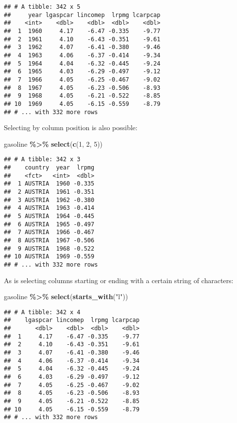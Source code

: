 \documentclass[
]{article}
\newenvironment{Shaded}{\begin{snugshade}}{\end{snugshade}}
\newcommand{\DecValTok}[1]{\textcolor[rgb]{0.00,0.00,0.81}{#1}}
\newcommand{\KeywordTok}[1]{\textcolor[rgb]{0.13,0.29,0.53}{\textbf{#1}}}
\newcommand{\NormalTok}[1]{#1}
\newcommand{\OperatorTok}[1]{\textcolor[rgb]{0.81,0.36,0.00}{\textbf{#1}}}
\newcommand{\StringTok}[1]{\textcolor[rgb]{0.31,0.60,0.02}{#1}}
\begin{document}
\begin{verbatim}
## # A tibble: 342 x 5
##     year lgaspcar lincomep  lrpmg lcarpcap
##    <int>    <dbl>    <dbl>  <dbl>    <dbl>
##  1  1960     4.17    -6.47 -0.335    -9.77
##  2  1961     4.10    -6.43 -0.351    -9.61
##  3  1962     4.07    -6.41 -0.380    -9.46
##  4  1963     4.06    -6.37 -0.414    -9.34
##  5  1964     4.04    -6.32 -0.445    -9.24
##  6  1965     4.03    -6.29 -0.497    -9.12
##  7  1966     4.05    -6.25 -0.467    -9.02
##  8  1967     4.05    -6.23 -0.506    -8.93
##  9  1968     4.05    -6.21 -0.522    -8.85
## 10  1969     4.05    -6.15 -0.559    -8.79
## # ... with 332 more rows
\end{verbatim}

Selecting by column position is also possible:

\begin{Shaded}
\begin{Highlighting}[]
\NormalTok{gasoline }\OperatorTok{\%\textgreater{}\%}
\StringTok{  }\KeywordTok{select}\NormalTok{(}\KeywordTok{c}\NormalTok{(}\DecValTok{1}\NormalTok{, }\DecValTok{2}\NormalTok{, }\DecValTok{5}\NormalTok{))}
\end{Highlighting}
\end{Shaded}

\begin{verbatim}
## # A tibble: 342 x 3
##    country  year  lrpmg
##    <fct>   <int>  <dbl>
##  1 AUSTRIA  1960 -0.335
##  2 AUSTRIA  1961 -0.351
##  3 AUSTRIA  1962 -0.380
##  4 AUSTRIA  1963 -0.414
##  5 AUSTRIA  1964 -0.445
##  6 AUSTRIA  1965 -0.497
##  7 AUSTRIA  1966 -0.467
##  8 AUSTRIA  1967 -0.506
##  9 AUSTRIA  1968 -0.522
## 10 AUSTRIA  1969 -0.559
## # ... with 332 more rows
\end{verbatim}

As is selecting columns starting or ending with a certain string of characters:

\begin{Shaded}
\begin{Highlighting}[]
\NormalTok{gasoline }\OperatorTok{\%\textgreater{}\%}
\StringTok{  }\KeywordTok{select}\NormalTok{(}\KeywordTok{starts\_with}\NormalTok{(}\StringTok{"l"}\NormalTok{))}
\end{Highlighting}
\end{Shaded}

\begin{verbatim}
## # A tibble: 342 x 4
##    lgaspcar lincomep  lrpmg lcarpcap
##       <dbl>    <dbl>  <dbl>    <dbl>
##  1     4.17    -6.47 -0.335    -9.77
##  2     4.10    -6.43 -0.351    -9.61
##  3     4.07    -6.41 -0.380    -9.46
##  4     4.06    -6.37 -0.414    -9.34
##  5     4.04    -6.32 -0.445    -9.24
##  6     4.03    -6.29 -0.497    -9.12
##  7     4.05    -6.25 -0.467    -9.02
##  8     4.05    -6.23 -0.506    -8.93
##  9     4.05    -6.21 -0.522    -8.85
## 10     4.05    -6.15 -0.559    -8.79
## # ... with 332 more rows
\end{verbatim}
\end{document}
